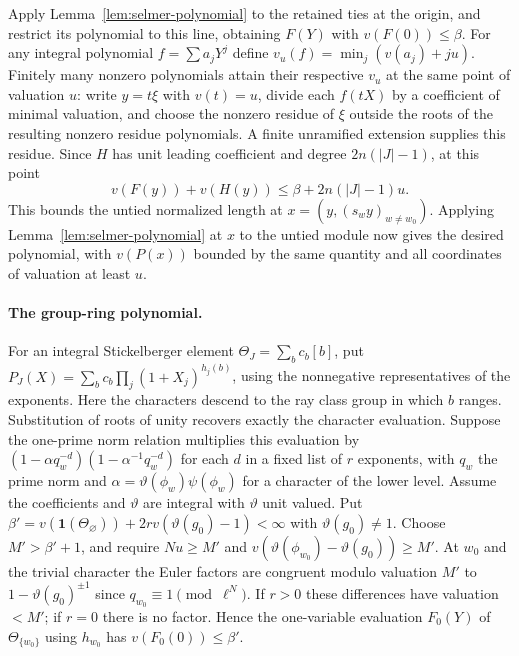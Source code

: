 Apply Lemma~\ref{lem:selmer-polynomial} to the retained ties at the origin,
and restrict its polynomial to this line, obtaining $F(Y)$ with
$v(F(0))\leq\beta$. For any integral polynomial $f=\sum a_jY^j$ define
$v_u(f)=\min_j(v(a_j)+ju)$. Finitely many nonzero polynomials attain their
respective $v_u$ at the same point of valuation $u$: write $y=t\xi$ with
$v(t)=u$, divide each $f(tX)$ by a coefficient of minimal valuation, and
choose the nonzero residue of $\xi$ outside the roots of the resulting
nonzero residue polynomials. A finite unramified extension supplies this
residue. Since $H$ has unit leading coefficient and degree
$2n(|J|-1)$, at this point
\[
 v(F(y))+v(H(y))\leq\beta+2n(|J|-1)u .
\]
This bounds the untied normalized length at $x=(y,(s_wy)_{w\ne w_0})$.
Applying Lemma~\ref{lem:selmer-polynomial} at $x$ to the untied module now
gives the desired polynomial, with $v(P(x))$ bounded by the same quantity
and all coordinates of valuation at least $u$.

\paragraph{The group-ring polynomial.}
For an integral Stickelberger element $\Theta_J=\sum_b c_b[b]$, put
$P_J(X)=\sum_b c_b\prod_j(1+X_j)^{h_j(b)}$, using the nonnegative
representatives of the exponents. Here the characters descend to the ray
class group in which $b$ ranges. Substitution of roots of unity recovers exactly
the character evaluation. Suppose the one-prime norm relation multiplies this
evaluation by $(1-\alpha q_w^{-d})(1-\alpha^{-1}q_w^{-d})$ for each
$d$ in a fixed list of $r$ exponents, with $q_w$ the prime norm and
$\alpha=\vartheta(\phi_w)\psi(\phi_w)$ for a character of the lower level.
Assume the coefficients and $\vartheta$ are integral with $\vartheta$ unit
valued. Put $\beta'=v(\boldsymbol{1}(\Theta_\varnothing))+
2r v(\vartheta(g_0)-1)<\infty$ with $\vartheta(g_0)\ne1$.
Choose $M'>\beta'+1$, and require $Nu\geq M'$ and
$v(\vartheta(\phi_{w_0})-\vartheta(g_0))\geq M'$. At $w_0$ and the trivial
character the Euler factors are congruent modulo valuation $M'$ to
$1-\vartheta(g_0)^{\pm1}$ since $q_{w_0}\equiv1\pmod{\ell^N}$.
If $r>0$ these differences have valuation $<M'$; if $r=0$ there is no factor.
Hence the one-variable evaluation $F_0(Y)$ of $\Theta_{\{w_0\}}$ using
$h_{w_0}$ has $v(F_0(0))\leq\beta'$.

